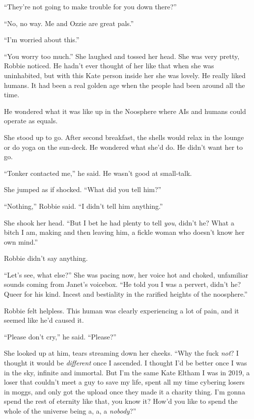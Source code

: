“They’re not going to make trouble for you down there?”

“No, no way. Me and Ozzie are great pals.”

“I’m worried about this.”

“You worry too much.” She laughed and tossed her head. She was very
pretty, Robbie noticed. He hadn’t ever thought of her like that
when she was uninhabited, but with this Kate person inside her she
was lovely. He really liked humans. It had been a real golden age
when the people had been around all the time.

He wondered what it was like up in the Noosphere where AIs and
humans could operate as equals.

She stood up to go. After second breakfast, the shells would relax
in the lounge or do yoga on the sun-deck. He wondered what she’d
do. He didn’t want her to go.

“Tonker contacted me,” he said. He wasn’t good at small-talk.

She jumped as if shocked. “What did you tell him?”

“Nothing,” Robbie said. “I didn’t tell him anything.”

She shook her head. “But I bet he had plenty to tell \emph{you},
didn’t he? What a bitch I am, making and then leaving him, a fickle
woman who doesn’t know her own mind.”

Robbie didn’t say anything.

“Let’s see, what else?” She was pacing now, her voice hot and
choked, unfamiliar sounds coming from Janet’s voicebox. “He told
you I was a pervert, didn’t he? Queer for his kind. Incest and
bestiality in the rarified heights of the noosphere.”

Robbie felt helpless. This human was clearly experiencing a lot of
pain, and it seemed like he’d caused it.

“Please don’t cry,” he said. “Please?”

She looked up at him, tears streaming down her cheeks. “Why the
fuck \emph{not}? I thought it would be \emph{different} once I
ascended. I thought I’d be better once I was in the sky, infinite
and immortal. But I’m the same Kate Eltham I was in 2019, a loser
that couldn’t meet a guy to save my life, spent all my time
cybering losers in moggs, and only got the upload once they made it
a charity thing. I’m gonna spend the rest of eternity like that,
you know it? How’d you like to spend the whole of the universe
being a, a, a \emph{nobody}?”

